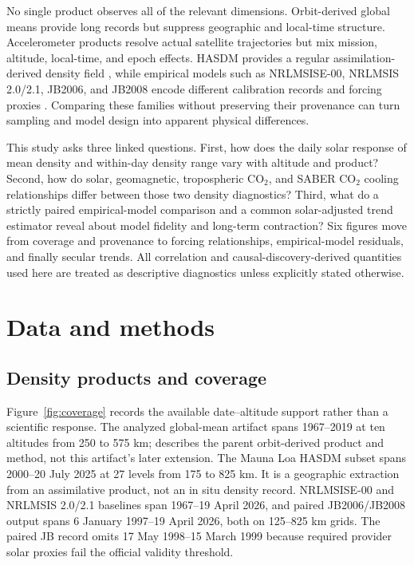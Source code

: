 \documentclass[11pt]{article}
\begin{document}
No single product observes all of the relevant dimensions.  Orbit-derived
global means provide long records but suppress geographic and local-time
structure.  Accelerometer products resolve actual satellite trajectories but
mix mission, altitude, local-time, and epoch effects.  HASDM provides a regular
assimilation-derived density field \citep{storz2005}, while empirical models
such as NRLMSISE-00, NRLMSIS 2.0/2.1, JB2006, and JB2008 encode different
calibration records and forcing proxies \citep{picone2002,emmert2021,emmert2022,
bowman2008jb2006,bowman2008jb2008}.  Comparing these families without preserving
their provenance can turn sampling and model design into apparent physical
differences.

This study asks three linked questions.  First, how does the daily solar
response of mean density and within-day density range vary with altitude and
product?  Second, how do solar, geomagnetic, tropospheric CO$_2$, and SABER CO$_2$
cooling relationships differ between those two density diagnostics?  Third,
what do a strictly paired empirical-model comparison and a common
solar-adjusted trend estimator reveal about model fidelity and long-term
contraction?  Six figures move from coverage and provenance to forcing
relationships, empirical-model residuals, and finally secular trends.  All
correlation and causal-discovery-derived quantities used here are treated as
descriptive diagnostics unless explicitly stated otherwise.

\section{Data and methods}

\subsection{Density products and coverage}

Figure~\ref{fig:coverage} records the available date--altitude support rather
than a scientific response.  The analyzed global-mean artifact spans
1967--2019 at ten altitudes from 250 to 575 km; \citet{emmert2009} describes
the parent orbit-derived product and method, not this artifact's later
extension.  The Mauna
Loa HASDM subset spans 2000--20 July 2025 at 27 levels from 175 to 825 km.  It is
a geographic extraction from an assimilative product, not an in situ density
record.  NRLMSISE-00 and NRLMSIS 2.0/2.1 baselines span 1967--19 April 2026,
and paired JB2006/JB2008 output spans 6 January 1997--19 April 2026, both on
125--825 km grids.  The paired JB record omits 17 May 1998--15 March 1999 because
required provider solar proxies fail the official validity threshold.
\end{document}
